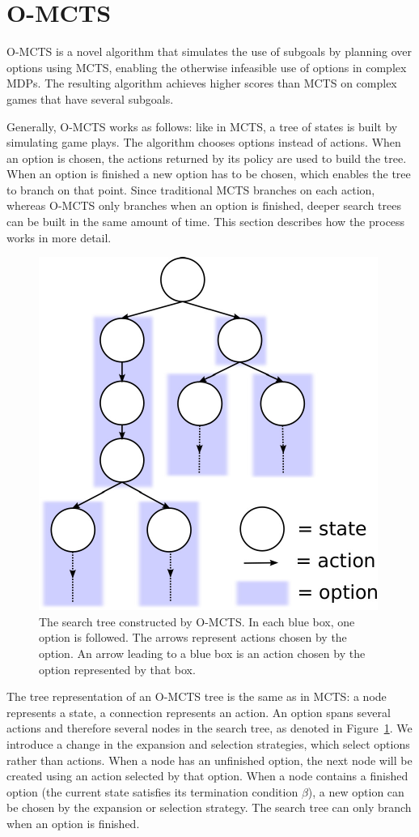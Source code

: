 \section{O-MCTS}
\label{sec:planning}

O-MCTS is a novel algorithm that simulates the use of subgoals by planning over
options using MCTS, enabling the otherwise infeasible use of options in complex
MDPs\@. The resulting algorithm achieves higher scores than MCTS on complex
games that have several subgoals.

Generally, O-MCTS works as follows: like in MCTS, a tree of states is
built by simulating game plays. The algorithm chooses options instead of
actions. When an option is chosen, the actions returned by its policy are used
to build the tree. When an option is finished a new option has to be chosen,
which enables the tree to branch on that point. Since traditional MCTS branches
on each action, whereas O-MCTS only branches when an option is finished, deeper
search trees can be built in the same amount of time. This section describes how
the process works in more detail.

\begin{figure}
	\centering
	\includegraphics[width=.5\columnwidth]{includes/omcts-eps-converted-to.pdf}
	\caption{The search tree constructed by O-MCTS\@. In each blue box, one
	option is followed. The arrows represent actions chosen by the option. An
	arrow leading to a blue box is an action chosen by the option represented by
	that box.}
\label{fig:omcts-tree}
\end{figure}


The tree representation of an O-MCTS tree is the same as in MCTS\@: a node
represents a state, a connection represents an action. An option spans several
actions and therefore several nodes in the search tree, as denoted in
Figure~\ref{fig:omcts-tree}. We introduce a change in the expansion and
selection strategies, which select options rather than actions. When a node has
an unfinished option, the next node will be created using an action selected by
that option. When a node contains a finished option (the current state satisfies
its termination condition $\beta$), a new option can be chosen by the expansion
or selection strategy. The search tree can only branch when an option is
finished.

